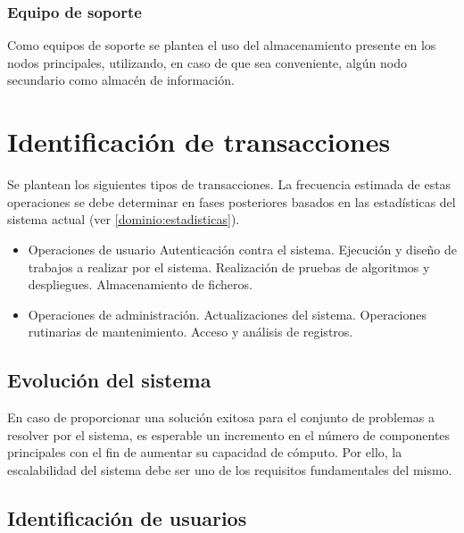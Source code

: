 \subsubsection{Equipo de soporte}

Como equipos de soporte se plantea el uso del almacenamiento presente en los nodos principales, utilizando, en caso de que sea conveniente, algún nodo secundario como almacén de información.

\section{Identificación de transacciones}

Se plantean los siguientes tipos de transacciones. La frecuencia estimada de estas operaciones se debe determinar en fases posteriores basados en las estadísticas del sistema actual (ver \ref{dominio:estadisticas}).

\begin{itemize}
  \item Operaciones de usuario
    \subitem Autenticación contra el sistema.
    \subitem Ejecución y diseño de trabajos a realizar por el sistema.
    \subitem Realización de pruebas de algoritmos y despliegues.
    \subitem Almacenamiento de ficheros.
  \item Operaciones de administración.
    \subitem Actualizaciones del sistema.
    \subitem Operaciones rutinarias de mantenimiento.
    \subitem Acceso y análisis de registros.
\end{itemize}

\subsection{Evolución del sistema}

En caso de proporcionar una solución exitosa para el conjunto de problemas a resolver por el sistema, es esperable un incremento en el número de componentes principales con el fin de aumentar su capacidad de cómputo. Por ello, la escalabilidad del sistema debe ser uno de los requisitos fundamentales del mismo.



\subsection{Identificación de usuarios}

